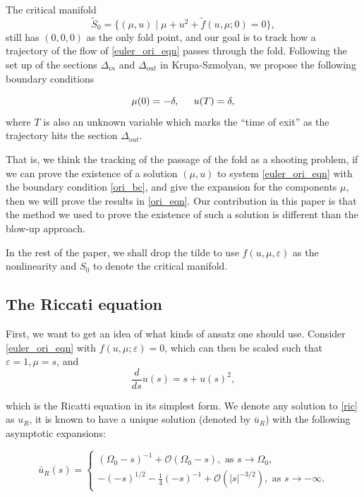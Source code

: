 \documentclass[letterpaper,11pt]{article}
\newcommand{\rmO}{\mathcal{O}}
\newcommand{\eps}{\varepsilon}
\numberwithin{equation}{section}
\theoremstyle{plain}
\begin{document}
The critical manifold 
\[
\tilde{S}_0 = \{ (\mu, u) \mid \mu + u^2 + \tilde{f}(u,\mu;0) = 0\},
\]
still has $(0,0,0)$ as the only fold point, and our goal is to track how a trajectory of the flow of \eqref{euler_ori_eqn} passes through the fold. Following the set up of the sections $\Delta_{in}$ and $\Delta_{out}$ in Krupa-Szmolyan, we propose the following boundary conditions

\begin{equation}\label{ori_bc}
\mu(0) = -\delta, \hspace{0.2in} u(T) = \delta,
\end{equation}
where $T$ is also an unknown variable which marks the ``time of exit'' as the trajectory hits the section $\Delta_{out}$.

That is, we think the tracking of the passage of the fold as a shooting problem, if we can prove the existence of a solution $(\mu, u)$ to system \eqref{euler_ori_eqn} with the boundary condition \eqref{ori_bc}, and give the expansion for the components $\mu$, then we will prove the results in \eqref{ori_eqn}. Our contribution in this paper is that the method we used to prove the existence of such a solution is different than the blow-up approach.

In the rest of the paper, we shall drop the tilde to use $f(u,\mu,\eps)$ as the nonlinearity and $S_0$ to denote the critical manifold.



\subsection{The Riccati equation}\label{Ric_def}
First, we want to get an idea of what kinds of ansatz one should use. Consider \eqref{euler_ori_eqn} with $f(u,\mu;\eps) = 0$, which can then be scaled such that $\eps = 1, \mu = s$, and 
\begin{equation}\label{ric}
\frac{d}{ds}u(s) = s+u(s)^2,
\end{equation}

which is the Ricatti equation in its simplest form. We denote any solution to \eqref{ric} as $u_R$, it is known to have a unique solution (denoted by $\bar{u}_R$) with the following asymptotic expansions:

\begin{equation} \label{ric_asy}
\bar{u}_R(s)=\begin{cases}
  (\Omega_0-s)^{-1}+\rmO(\Omega_0-s), \text{ as }s \to \Omega_0, \\
 -(-s)^{1/2} -\frac{1}{4}(-s)^{-1} + \rmO(|s|^{-3/2}), \text{ as }s \to -\infty.
\end{cases}
\end{equation}
\end{document}
